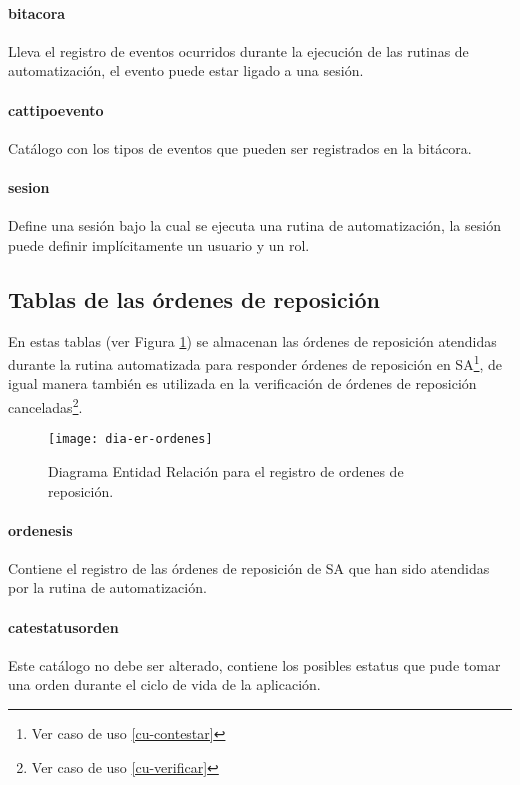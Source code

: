 \paragraph{bitacora\\} Lleva el registro de eventos ocurridos durante la ejecución de las rutinas de automatización, el evento puede estar ligado a una sesión.
\paragraph{cat{\textunderscore}tipo{\textunderscore}evento\\} Catálogo con los tipos de eventos que pueden ser registrados en la bitácora.
\paragraph{sesion\\} Define una sesión bajo la cual se ejecuta una rutina de automatización, la sesión puede definir implícitamente un usuario y un rol.

\subsection{Tablas de las órdenes de reposición}
En estas tablas (ver Figura \ref{fig:dia-er-ordenes}) se almacenan las órdenes de reposición atendidas durante la rutina automatizada para responder órdenes de reposición en SA\footnote{Ver caso de uso \ref{cu-contestar}}, de igual manera también es utilizada en la verificación de órdenes de reposición canceladas\footnote{Ver caso de uso \ref{cu-verificar}}.
\begin{figure}[h]
  \centering
  \texttt{[image: dia-er-ordenes]} 
  \caption{Diagrama Entidad Relación para el registro de ordenes de reposición.}
  \label{fig:dia-er-ordenes}
\end{figure}
\paragraph{ordenes{\textunderscore}is\\} Contiene el registro de las órdenes de reposición de SA que han sido atendidas por la rutina de automatización.
\paragraph{cat{\textunderscore}estatus{\textunderscore}orden\\} Este catálogo no debe ser alterado, contiene los posibles estatus que pude tomar una orden durante el ciclo de vida de la aplicación.
